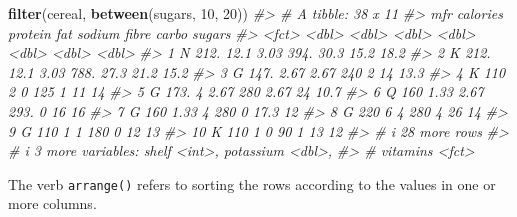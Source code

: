 \documentclass[
]{book}
\newenvironment{Shaded}{\begin{snugshade}}{\end{snugshade}}
\newcommand{\CommentTok}[1]{\textcolor[rgb]{0.56,0.35,0.01}{\textit{#1}}}
\newcommand{\DecValTok}[1]{\textcolor[rgb]{0.00,0.00,0.81}{#1}}
\newcommand{\FunctionTok}[1]{\textcolor[rgb]{0.13,0.29,0.53}{\textbf{#1}}}
\newcommand{\NormalTok}[1]{#1}
\begin{document}
\begin{Shaded}
\begin{Highlighting}[]
\FunctionTok{filter}\NormalTok{(cereal, }\FunctionTok{between}\NormalTok{(sugars, }\DecValTok{10}\NormalTok{, }\DecValTok{20}\NormalTok{))}
\CommentTok{\#\textgreater{} \# A tibble: 38 x 11}
\CommentTok{\#\textgreater{}    mfr   calories protein   fat sodium fibre carbo sugars}
\CommentTok{\#\textgreater{}    \textless{}fct\textgreater{}    \textless{}dbl\textgreater{}   \textless{}dbl\textgreater{} \textless{}dbl\textgreater{}  \textless{}dbl\textgreater{} \textless{}dbl\textgreater{} \textless{}dbl\textgreater{}  \textless{}dbl\textgreater{}}
\CommentTok{\#\textgreater{}  1 N         212.   12.1   3.03   394. 30.3   15.2   18.2}
\CommentTok{\#\textgreater{}  2 K         212.   12.1   3.03   788. 27.3   21.2   15.2}
\CommentTok{\#\textgreater{}  3 G         147.    2.67  2.67   240   2     14     13.3}
\CommentTok{\#\textgreater{}  4 K         110     2     0      125   1     11     14  }
\CommentTok{\#\textgreater{}  5 G         173.    4     2.67   280   2.67  24     10.7}
\CommentTok{\#\textgreater{}  6 Q         160     1.33  2.67   293.  0     16     16  }
\CommentTok{\#\textgreater{}  7 G         160     1.33  4      280   0     17.3   12  }
\CommentTok{\#\textgreater{}  8 G         220     6     4      280   4     26     14  }
\CommentTok{\#\textgreater{}  9 G         110     1     1      180   0     12     13  }
\CommentTok{\#\textgreater{} 10 K         110     1     0       90   1     13     12  }
\CommentTok{\#\textgreater{} \# i 28 more rows}
\CommentTok{\#\textgreater{} \# i 3 more variables: shelf \textless{}int\textgreater{}, potassium \textless{}dbl\textgreater{},}
\CommentTok{\#\textgreater{} \#   vitamins \textless{}fct\textgreater{}}
\end{Highlighting}
\end{Shaded}

The verb \texttt{arrange()} refers to sorting the rows according to the values in one or more columns.
\end{document}
